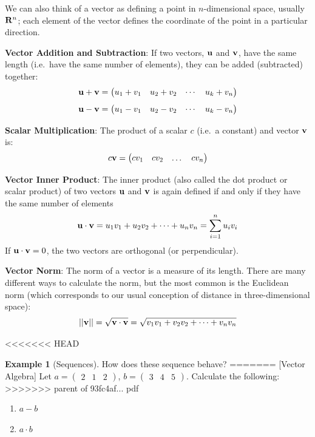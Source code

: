 \documentclass[]{book}
\theoremstyle{definition}
\theoremstyle{definition}
\newtheorem{example}{Example}[chapter]
\theoremstyle{definition}
\theoremstyle{remark}
\begin{document}
We can also think of a vector as defining a point in \(n\)-dimensional space, usually \({\bf R}^n\); each element of the vector defines the coordinate of the point in a particular direction.

\textbf{Vector Addition and Subtraction}: If two vectors, \({\bf u}\) and \({\bf v}\), have the same length (i.e.~have the same number of elements), they can be added (subtracted) together:
\[ {\bf u} + {\bf v} = \begin{pmatrix} u_1 + v_1 & u_2 + v_2 & \cdots & u_k + v_n \end{pmatrix}\]
\[ {\bf u} - {\bf v} = \begin{pmatrix} u_1 - v_1 & u_2 - v_2 & \cdots & u_k - v_n \end{pmatrix}\]

\textbf{Scalar Multiplication}: The product of a scalar \(c\) (i.e.~a constant) and vector \({\bf v}\) is:\\
\[ c{\bf v} =  \begin{pmatrix} cv_1 & cv_2 & \dots & cv_n \end{pmatrix} \]

\textbf{Vector Inner Product}: The inner product (also called the dot product or scalar product) of two vectors \({\bf u}\) and \({\bf v}\) is again defined if and only if they have the same number of elements
\[ {\bf u} \cdot {\bf v} = u_1v_1 + u_2v_2 + \cdots + u_nv_n = \sum_{i = 1}^n u_iv_i\]
If \({\bf u} \cdot {\bf v} = 0\), the two vectors are orthogonal (or perpendicular).

\textbf{Vector Norm}: The norm of a vector is a measure of its length. There are many different ways to calculate the norm, but the most common is the Euclidean norm (which corresponds to our usual conception of distance in three-dimensional space):
\[ ||{\bf v}|| = \sqrt{{\bf v}\cdot{\bf v}} = \sqrt{ v_1v_1 + v_2v_2 + \cdots + v_nv_n}\]

<<<<<<< HEAD
\begin{example}[Sequences]
\protect\hypertarget{exm:seqbehav}{}{\label{exm:seqbehav} {} }
How does these sequence behave?
=======
[Vector Algebra]
\protect\hypertarget{exm:vectors}{}{\label{exm:vectors} {} }
Let \(a = \begin{pmatrix} 2&1&2\end{pmatrix}\), \(b = \begin{pmatrix} 3&4&5 \end{pmatrix}\). Calculate the following:
>>>>>>> parent of 93fc4af... pdf

\begin{enumerate}
\def\labelenumi{\arabic{enumi}.}
\item
  \(a - b\)
\item
  \(a \cdot b\)
\end{enumerate}
\end{example}
\end{document}
